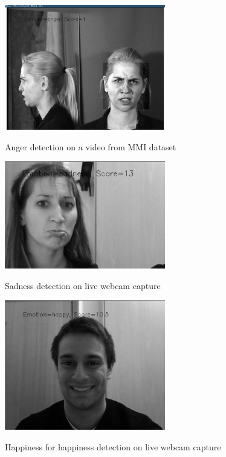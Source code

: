 \begin{figure}
\centering
\includegraphics[width=7cm]{images/example_anger.png}
\label{fig:example_anger}
\caption{Anger detection on a video from MMI dataset}
\end{figure}

\begin{figure}
\centering
\includegraphics[width=7cm]{images/example_sad.png}
\label{fig:example_sad}
\caption{Sadness detection on live webcam capture}
\end{figure}

\begin{figure}
\centering
\includegraphics[width=7cm]{images/exampl_happy2.png}
\label{fig:exampl_happy2}
\caption{Happiness for happiness detection on live webcam capture}
\end{figure}

